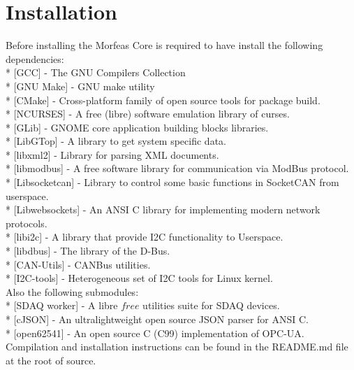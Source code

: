 \section{Installation}
Before installing the Morfeas Core is required to have install the following dependencies:\\
* [GCC] - The GNU Compilers Collection\\
* [GNU Make] - GNU make utility\\
* [CMake] - Cross-platform family of open source tools for package build.\\
* [NCURSES] - A free (libre) software emulation library of curses.\\
* [GLib] - GNOME core application building blocks libraries.\\
* [LibGTop] - A library to get system specific data.\\
* [libxml2] - Library for parsing XML documents.\\
* [libmodbus] - A free software library for communication via ModBus protocol.\\
* [Libsocketcan] - Library to control some basic functions in SocketCAN from userspace.\\
* [Libwebsockets] - An ANSI C library for implementing modern network protocols.\\
* [libi2c] - A library that provide I2C functionality to Userspace.\\
* [libdbus] - The library of the D-Bus.\\
* [CAN-Utils] - CANBus utilities.\\
* [I2C-tools] - Heterogeneous set of I2C tools for Linux kernel.\\
Also the following submodules:\\
* [SDAQ worker] - A libre \(free\) utilities suite for SDAQ devices.\\
* [cJSON] - An ultralightweight open source JSON parser for ANSI C.\\
* [open62541] - An open source C (C99) implementation of OPC-UA.\\

Compilation and installation instructions can be found in the README.md file at the root of source.
